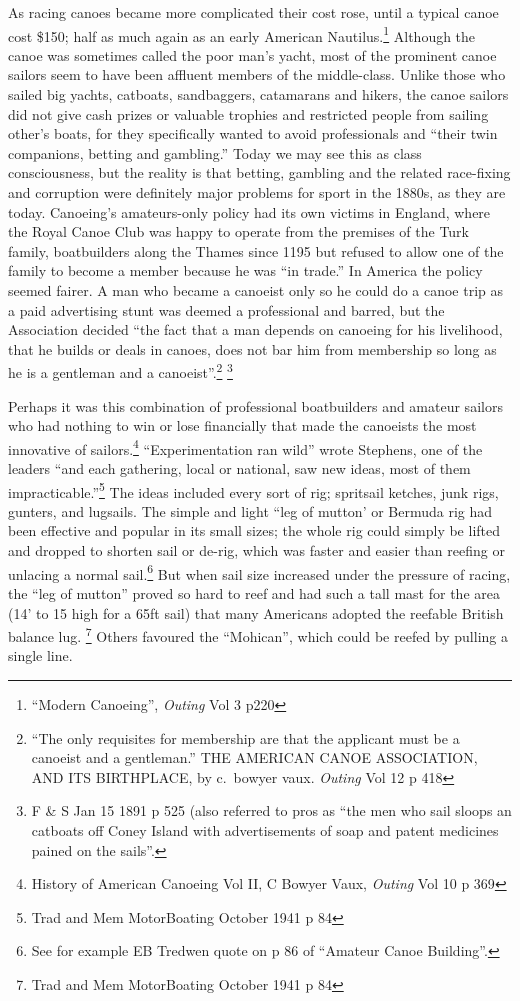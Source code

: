 \documentclass[
  letterpaper,
]{scrbook}
\begin{document}
As racing canoes became more complicated their cost rose, until a
typical canoe cost \$150; half as much again as an early American
Nautilus.\footnote{``Modern Canoeing'', \emph{Outing} Vol 3 p220}
Although the canoe was sometimes called the poor man's yacht, most of
the prominent canoe sailors seem to have been affluent members of the
middle-class. Unlike those who sailed big yachts, catboats, sandbaggers,
catamarans and hikers, the canoe sailors did not give cash prizes or
valuable trophies and restricted people from sailing other's boats, for
they specifically wanted to avoid professionals and ``their twin
companions, betting and gambling.'' Today we may see this as class
consciousness, but the reality is that betting, gambling and the related
race-fixing and corruption were definitely major problems for sport in
the 1880s, as they are today. Canoeing's amateurs-only policy had its
own victims in England, where the Royal Canoe Club was happy to operate
from the premises of the Turk family, boatbuilders along the Thames
since 1195 but refused to allow one of the family to become a member
because he was ``in trade.'' In America the policy seemed fairer. A man
who became a canoeist only so he could do a canoe trip as a paid
advertising stunt was deemed a professional and barred, but the
Association decided ``the fact that a man depends on canoeing for his
livelihood, that he builds or deals in canoes, does not bar him from
membership so long as he is a gentleman and a canoeist''.\footnote{``The
  only requisites for membership are that the applicant must be a
  canoeist and a gentleman.'' THE AMERICAN CANOE ASSOCIATION, AND ITS
  BIRTHPLACE, by c.~bowyer vaux. \emph{Outing} Vol 12 p 418} \footnote{F
  \& S Jan 15 1891 p 525 (also referred to pros as ``the men who sail
  sloops an catboats off Coney Island with advertisements of soap and
  patent medicines pained on the sails''.}

Perhaps it was this combination of professional boatbuilders and amateur
sailors who had nothing to win or lose financially that made the
canoeists the most innovative of sailors.\footnote{History of American
  Canoeing Vol II, C Bowyer Vaux, \emph{Outing} Vol 10 p 369}
``Experimentation ran wild'' wrote Stephens, one of the leaders ``and
each gathering, local or national, saw new ideas, most of them
impracticable.''\footnote{Trad and Mem MotorBoating October 1941 p 84}
The ideas included every sort of rig; spritsail ketches, junk rigs,
gunters, and lugsails. The simple and light ``leg of mutton' or Bermuda
rig had been effective and popular in its small sizes; the whole rig
could simply be lifted and dropped to shorten sail or de-rig, which was
faster and easier than reefing or unlacing a normal sail.\footnote{See
  for example EB Tredwen quote on p 86 of ``Amateur Canoe Building''.}
But when sail size increased under the pressure of racing, the ``leg of
mutton'' proved so hard to reef and had such a tall mast for the area
(14' to 15 high for a 65ft sail) that many Americans adopted the
reefable British balance lug. \footnote{Trad and Mem MotorBoating
  October 1941 p 84} Others favoured the ``Mohican'', which could be
reefed by pulling a single line.
\end{document}
